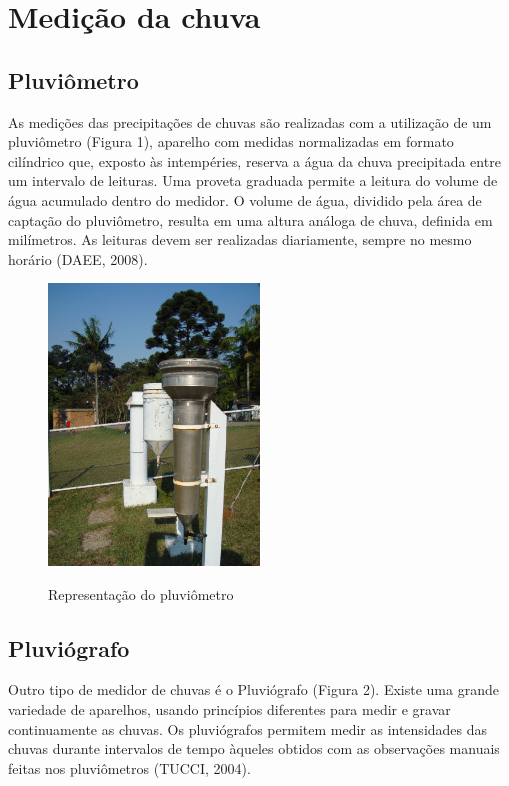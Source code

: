 \section{Medição da chuva}

\subsection{Pluviômetro}
As medições das precipitações de chuvas são realizadas com a utilização de um pluviômetro (Figura 1), aparelho com medidas normalizadas em formato cilíndrico que, exposto às intempéries, reserva a água da chuva precipitada entre um intervalo de leituras. Uma proveta graduada permite a leitura do volume de água acumulado dentro do medidor. O volume de água, dividido pela área de captação do pluviômetro, resulta em uma altura análoga de chuva, definida em milímetros. As leituras devem ser realizadas diariamente, sempre no mesmo horário (DAEE, 2008).

\begin{figure}
    \caption{Representação do pluviômetro}
    \centering
    \includegraphics[width=0.5\textwidth]{Textuais/Figuras/pluviometro.jpg}
    \label{fig:pluviometro}
\end{figure}

\subsection{Pluviógrafo}

Outro tipo de medidor de chuvas é o Pluviógrafo (Figura 2). Existe uma grande variedade de aparelhos, usando princípios diferentes para medir e gravar continuamente as chuvas. Os pluviógrafos permitem medir as intensidades das chuvas durante intervalos de tempo àqueles obtidos com as observações manuais feitas nos pluviômetros (TUCCI, 2004).

